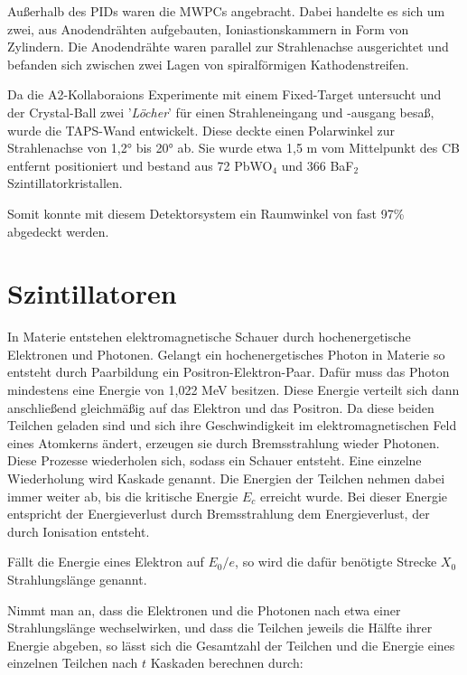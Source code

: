 \documentclass[a4paper,11pt,oneside,final,german,openbib,pdftex]{scrbook}
\begin{document}
{Au{\ss}erhalb des PIDs waren die MWPCs angebracht. Dabei handelte es sich um zwei, aus Anodendr\"ahten aufgebauten, Ioniastionskammern in Form von Zylindern. Die Anodendr\"ahte waren parallel zur Strahlenachse ausgerichtet und befanden sich zwischen zwei Lagen von spiralf\"ormigen Kathodenstreifen. 

Da die A2-Kollaboraions Experimente mit einem Fixed-Target untersucht und der Crystal-Ball zwei '\textit{L\"ocher}' f\"ur einen Strahleneingang und -ausgang besa{\ss}, wurde die TAPS-Wand entwickelt. Diese deckte einen Polarwinkel zur Strahlenachse von 1,2° bis 20° ab. Sie wurde etwa 1,5 m vom Mittelpunkt des CB entfernt positioniert und bestand aus 72 PbWO$_4$ und 366 BaF$_2$ Szintillatorkristallen. 

Somit konnte mit diesem Detektorsystem ein Raumwinkel von fast 97\% abgedeckt werden.

\section{Szintillatoren}
\label{fig:Szintillatoren}

In Materie entstehen elektromagnetische Schauer durch hochenergetische Elektronen und Photonen. \cite{Leo87}
Gelangt ein hochenergetisches Photon in Materie so entsteht durch Paarbildung ein Positron-Elektron-Paar. Dafür muss das Photon mindestens eine Energie von 1,022 MeV besitzen. Diese Energie verteilt sich dann anschließend gleichmäßig auf das Elektron und das Positron. Da diese beiden Teilchen geladen sind und sich ihre Geschwindigkeit im elektromagnetischen Feld eines Atomkerns ändert, erzeugen sie durch Bremsstrahlung wieder Photonen. Diese Prozesse wiederholen sich, sodass ein Schauer entsteht. Eine einzelne Wiederholung wird Kaskade genannt. Die Energien der Teilchen nehmen dabei immer weiter ab, bis die kritische Energie $E_c$ erreicht wurde. Bei dieser Energie entspricht der Energieverlust durch Bremsstrahlung dem Energieverlust, der durch Ionisation entsteht.

Fällt die Energie eines Elektron auf $E_0/e$, so wird die dafür benötigte Strecke $X_0$ Strahlungslänge genannt.
\newline

Nimmt man an, dass die Elektronen und die Photonen nach etwa einer Strahlungslänge wechselwirken, und dass die Teilchen jeweils die Hälfte ihrer Energie abgeben, so lässt sich die Gesamtzahl der Teilchen und die Energie eines einzelnen Teilchen nach $t$ Kaskaden berechnen durch\cite{Leo87}:

}
\end{document}
